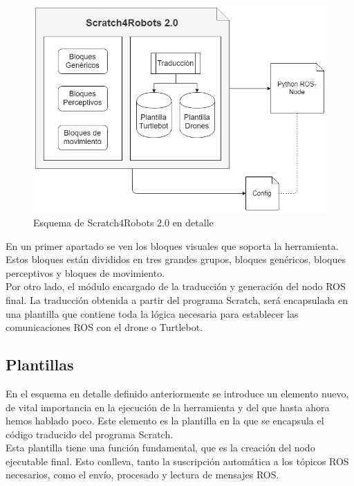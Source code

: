 \begin{figure}[H]
    \centering
    \includegraphics[scale=0.55]{img/esq-caja-blanca.png}
  	\caption{Esquema de Scratch4Robots 2.0 en detalle}
  	\label{fig:s4r}
\end{figure}

En un primer apartado se ven los bloques visuales que soporta la herramienta. Estos bloques están divididos en tres grandes grupos, bloques genéricos, bloques perceptivos y bloques de movimiento.\\

Por otro lado, el módulo encargado de la traducción y generación del nodo ROS final. La traducción obtenida a partir del programa Scratch, será encapsulada en una plantilla que contiene toda la lógica necesaria para establecer las comunicaciones ROS con el drone o Turtlebot.

\subsection{Plantillas}
En el esquema en detalle definido anteriormente se introduce un elemento nuevo, de vital importancia en la ejecución de la herramienta y del que hasta ahora hemos hablado poco. Este elemento es la plantilla en la que se encapsula el código traducido del programa Scratch.\\

Esta plantilla tiene una función fundamental, que es la creación del nodo ejecutable final. Esto conlleva, tanto la suscripción automática a los tópicos ROS necesarios, como el envío, procesado y lectura de mensajes ROS.\\


